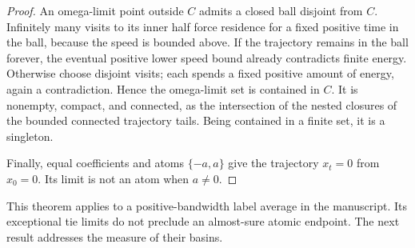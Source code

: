 \documentclass[11pt]{article}
\begin{document}
\begin{proof}
An omega-limit point outside $C$ admits a closed ball disjoint from $C$.
Infinitely many visits to its inner half force residence for a fixed positive
time in the ball, because the speed is bounded above. If the trajectory remains
in the ball forever, the eventual positive lower speed bound already contradicts
finite energy. Otherwise choose disjoint visits; each spends a fixed positive
amount of energy, again a contradiction. Hence the omega-limit set is contained
in $C$. It is nonempty, compact, and connected, as the intersection of the nested
closures of the bounded connected trajectory tails. Being contained in a finite
set, it is a singleton.

Finally, equal coefficients and atoms $\{-a,a\}$ give the trajectory $x_t=0$
from $x_0=0$. Its limit is not an atom when $a\ne0$.
\end{proof}
This theorem applies to a positive-bandwidth label average in the manuscript.
Its exceptional tie limits do not preclude an almost-sure atomic endpoint.
The next result addresses the measure of their basins.
\end{document}
